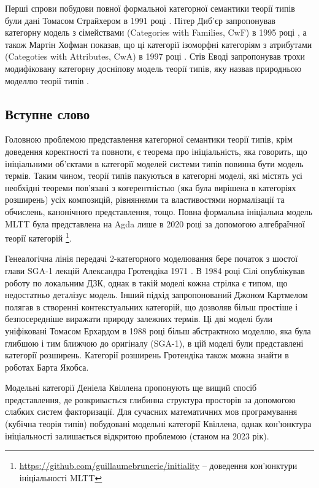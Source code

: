 Перші спрови побудови повної формальної категорної семантики теорії типів були дані
Томасом Страйхером в 1991 році \cite{Streicher91}. Пітер Диб'єр запропонував категорну модель з
сімействами (Categories with Families, CwF) в 1995 році \cite{Dybjer95}, а також Мартін Хофман показав, що ці
категорії ізоморфні категоріям з атрибутами (Categoties with Attributes, CwA) в 1997 році \cite{Hofmann97}.
Стів Еводі запропонував трохи модифіковану категорну досніпову модель теорії типів,
яку назвав природньою моделлю теорії типів \cite{Awodey17NaturalModels}.

\subsection{Вступне слово}
Головною проблемою представлення категорної семантики теорії типів, крім доведення коректності та повноти,
є теорема про ініціальність, яка говорить, що ініціальними об'єктами в категорії моделей системи типів повинна бути модель термів.
Таким чином, теорії типів пакуються в категорні моделі, які містять усі
необхідні теореми пов'язані з когерентністью (яка була вирішена в категоріях розширень\cite{Lumsdaine15}) усіх композицій, рівняннями та властивостями
нормалізації та обчислень, канонічного представлення, тощо. Повна формальна ініціальна модель MLTT була
представлена на Agda лише в 2020 році за допомогою алгебраїчної теорії
категорій \footnote{\url{https://github.com/guillaumebrunerie/initiality} -- доведення кон'юнктури ініціальності MLTT}.

Генеалогічна лінія передачі 2-категорного моделювання бере початок з шостої глави SGA-1 лекцій Александра Гротендіка 1971 \cite{SGA1}.
В 1984 році Сілі \cite{Seely84} опублікував роботу по локальним ДЗК, однак в такій моделі кожна
стрілка є типом, що недостатньо деталізує модель. Інший підхід запропонований Джоном Картмелом \cite{Cartmell86} полягав
в створенні контекстуальних категорій, що дозволяв більш простіше і безпосередніше виражати природу залежних термів.
Ці дві моделі були уніфіковані Томасом Ерхардом в 1988 році \cite{Ehrhard88} більш абстрактною моделлю,
яка була глибшою і тим ближчою до оригіналу (SGA-1), в цій моделі були представлені категорії розширень.
Категорії розширень Гротендіка також можна знайти в роботах Барта Якобса\cite{Jacobs93}\cite{Jacobs99}.

Модельні категорії Деніела Квіллена \cite{Quillen67} пропонують ще вищий спосіб представлення,
де розкривається глибинна структура просторів за допомогою слабких систем факторизації.
Для сучасних математичних мов програмування (кубічна теорія типів) побудовані модельні категорії Квіллена,
однак кон'юнктура ініціальності залишається відкритою проблемою (станом на 2023 рік).

